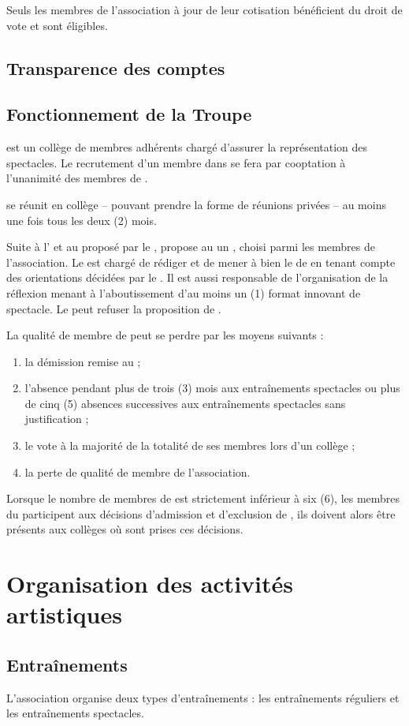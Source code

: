 \documentclass[a4paper,french,10pt]{article}
\newcommand{\article}[1]{\subsection{#1}\addtocounter{article}{1}}
\newcounter{article}
\begin{document}
Seuls les membres de l’association à jour de leur cotisation
bénéficient du droit de vote et sont éligibles.

\article{Transparence des comptes}
\label{sec:transp-des-compt}

\article{Fonctionnement de la Troupe}
\label{sec:fonctionnement-troupe}
\troupe{} est un collège de membres adhérents chargé d'assurer la représentation des spectacles. Le recrutement d'un membre dans \troupe{} se fera par cooptation à l'unanimité des membres de \troupe{}.

 \troupe{} se réunit en collège -- pouvant prendre la forme de réunions privées -- au moins une fois tous les deux (2) mois.

Suite à l'\AGO{} et au \PA{} proposé par le \bureau{}, \troupe{} propose au \bureau{} un \DA{}, choisi parmi les membres de l'association. Le \DA{} est chargé de rédiger et de mener à bien le \PA{} de \troupe{} en tenant compte des orientations décidées par le \bureau{}. Il est aussi responsable de l'organisation de la réflexion menant à l'aboutissement d'au moins un (1) format innovant de spectacle. Le \bureau{} peut refuser la proposition de \troupe{}. 

La qualité de membre de \troupe{} peut se perdre par les moyens suivants :

\begin{enumerate}
	\item la démission remise au \DA{} ;
	\item l'absence pendant plus de trois  (3) mois aux entraînements spectacles ou plus de cinq (5) absences successives aux entraînements spectacles sans justification ;
	\item le vote à la majorité de la totalité de ses membres lors d'un collège ;
	\item la perte de qualité de membre de l'association.

\end{enumerate}

Lorsque le nombre de membres de \troupe{} est strictement inférieur à six (6), les membres du \bureau{} participent aux décisions d'admission et d'exclusion de \troupe{}, ils doivent alors être présents aux collèges où sont prises ces décisions.

\section{Organisation des activités artistiques}
\article{Entraînements}
\label{sec:entrainements}
L'association organise deux types d'entraînements : les entraînements réguliers et les entraînements spectacles.
\end{document}
